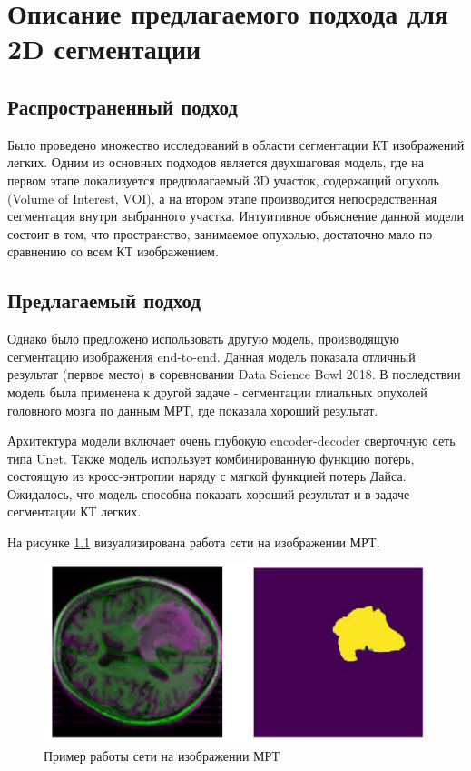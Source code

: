 \chapter{Описание предлагаемого подхода для 2D сегментации}

\section{Распространенный подход}

Было проведено множество исследований в области сегментации КТ изображений легких. Одним из основных подходов является двухшаговая модель, где на первом этапе локализуется предполагаемый 3D участок, содержащий опухоль (Volume of Interest, VOI), а на втором этапе производится непосредственная сегментация внутри выбранного участка. Интуитивное объяснение данной модели состоит в том, что пространство, занимаемое опухолью, достаточно мало по сравнению со всем КТ изображением.

\section{Предлагаемый подход}

Однако было предложено использовать другую модель, производящую сегментацию изображения end-to-end. Данная модель показала отличный результат (первое место) в соревновании Data Science Bowl 2018. В последствии модель была применена к другой задаче - сегментации глиальных опухолей головного мозга по данным МРТ, где показала хороший результат.

Архитектура модели включает очень глубокую encoder-decoder сверточную сеть типа Unet. Также модель использует комбинированную функцию потерь, состоящую из кросс-энтропии наряду с мягкой функцией потерь Дайса. Ожидалось, что модель способна показать хороший результат и в задаче сегментации КТ легких.

На рисунке \ref{mri-sample} визуализирована работа сети на изображении МРТ.

\begin{figure}[!h]
\includegraphics[width=\linewidth]{mri-sample.png}
\caption{Пример работы сети на изображении МРТ}\label{mri-sample}
\centering
\end{figure}